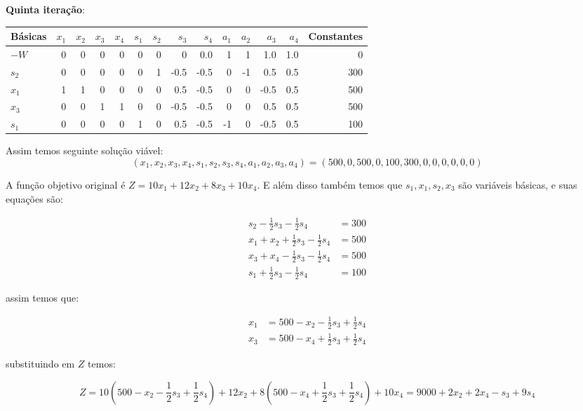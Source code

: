 \documentclass[12pt, a4paper]{article}
\begin{document}
\textbf{Quinta iteração}:
\begin{center}
\begin{tabular}{lrrrrrrrrrrrrr}
\toprule
Básicas & $x_1$ & $x_2$ & $x_3$ & $x_4$ & $s_1$ & $s_2$ & $s_3$ & $s_4$ & $a_1$ & $a_2$ & $a_3$ & $a_4$ & Constantes \\
\midrule
$-W$ & 0 & 0 & 0 & 0 & 0 & 0 & 0 & 0.0 & 1 & 1 & 1.0 & 1.0 & 0 \\
$s_2$ & 0 & 0 & 0 & 0 & 0 & 1 & -0.5 & -0.5 & 0 & -1 & 0.5 & 0.5 & 300 \\
$x_1$ & 1 & 1 & 0 & 0 & 0 & 0 & 0.5 & -0.5 & 0 & 0 & -0.5 & 0.5 & 500 \\
$x_3$ & 0 & 0 & 1 & 1 & 0 & 0 & -0.5 & -0.5 & 0 & 0 & 0.5 & 0.5 & 500 \\
$s_1$ & 0 & 0 & 0 & 0 & 1 & 0 & 0.5 & -0.5 & -1 & 0 & -0.5 & 0.5 & 100 \\
\bottomrule
\end{tabular}
\end{center}

Assim temos seguinte solução viável: 
$$
(x_1, x_2, x_3, x_4, s_1, s_2, s_3, s_4, a_1, a_2, a_3, a_4) = (500, 0, 500, 0, 100, 300, 0, 0, 0, 0, 0, 0)
$$

A função objetivo original é $Z = 10x_1 + 12x_2 + 8x_3 + 10x_4$. E além disso também temos que $s_1, x_1, s_2, x_3$ são variáveis básicas, e suas equações são:

\begin{align*}
  s_2 - \frac{1}{2}s_3 - \frac{1}{2}s_4 &= 300 \\
  x_1 + x_2 + \frac{1}{2}s_3 - \frac{1}{2}s_4 &= 500 \\
  x_3 + x_4 - \frac{1}{2}s_3 - \frac{1}{2}s_4 &= 500 \\
  s_1 + \frac{1}{2}s_3 - \frac{1}{2}s_4 &= 100
\end{align*}

assim temos que:

\begin{align*}
  x_1 &= 500 - x_2 - \frac{1}{2}s_3 + \frac{1}{2}s_4 \\
  x_3 &= 500 - x_4 + \frac{1}{2}s_3 + \frac{1}{2}s_4
\end{align*}

substituindo em $Z$ temos:

\begin{equation*}
  Z = 10(500 - x_2 - \frac{1}{2}s_3 + \frac{1}{2}s_4) + 12x_2 + 8(500 - x_4 + \frac{1}{2}s_3 + \frac{1}{2}s_4) + 10x_4 = 9000 + 2x_2 + 2x_4 - s_3 + 9s_4
\end{equation*}
\end{document}
